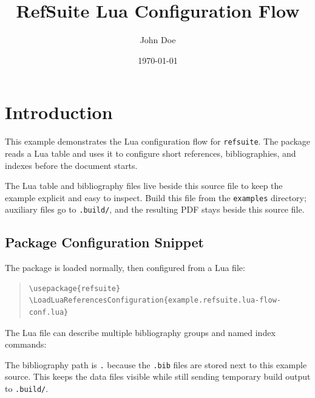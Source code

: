 \documentclass{article}
\begin{document}
\title{RefSuite Lua Configuration Flow}
\author{John Doe}
\date{\today}
\maketitle

\tableofcontents

\section{Introduction}
\label{sec:introduction}

This example demonstrates the Lua configuration flow for \texttt{refsuite}. The
package reads a Lua table and uses it to configure short references,
bibliographies, and indexes before the document starts.

The Lua table and bibliography files live beside this source file to keep the
example explicit and easy to inspect.  Build this file from the \texttt{examples}
directory; auxiliary files go to \texttt{.build/}, and the resulting PDF stays
beside this source file.

\subsection{Package Configuration Snippet}

The package is loaded normally, then configured from a Lua file:

\begin{quote}
\begin{verbatim}
\usepackage{refsuite}
\LoadLuaReferencesConfiguration{example.refsuite.lua-flow-conf.lua}
\end{verbatim}
\end{quote}

The Lua file can describe multiple bibliography groups and named index commands:

The bibliography path is \texttt{.} because the \texttt{.bib} files are stored
next to this example source.  This keeps the data files visible while still
sending temporary build output to \texttt{.build/}.
\end{document}
